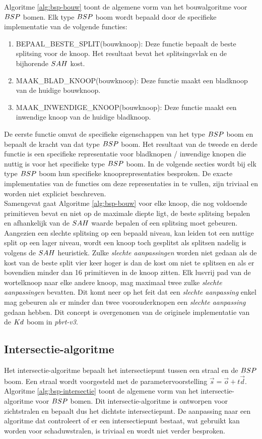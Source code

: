 Algoritme \ref{alg:bsp-bouw} toont de algemene vorm van het bouwalgoritme voor $BSP$ bomen.
Elk type $BSP$ boom wordt bepaald door de specifieke implementatie van de volgende functies:
\begin{enumerate}
    \item BEPAAL\_BESTE\_SPLIT(bouwknoop): Deze functie bepaalt de beste splitsing voor de knoop. Het resultaat bevat het splitsingsvlak en de bijhorende $SAH$ kost.
    \item MAAK\_BLAD\_KNOOP(bouwknoop): Deze functie maakt een bladknoop van de huidige bouwknoop.
    \item MAAK\_INWENDIGE\_KNOOP(bouwknoop): Deze functie maakt een inwendige knoop van de huidige bladknoop.
\end{enumerate}
De eerste functie omvat de specifieke eigenschappen van het type $BSP$ boom en bepaalt de kracht van dat type $BSP$ boom. 
Het resultaat van de tweede en derde functie is een specifieke representatie voor bladknopen / inwendige knopen die nuttig is voor het specifieke type $BSP$ boom.
In de volgende secties wordt bij elk type $BSP$ boom hun specifieke knooprepresentaties besproken.
De exacte implementaties van de functies om deze representaties in te vullen, zijn triviaal en worden niet expliciet beschreven.\\


Samengevat gaat Algoritme \ref{alg:bsp-bouw} voor elke knoop, die nog voldoende primitieven bevat en niet op de maximale diepte ligt, de beste splitsing bepalen en afhankelijk van de $SAH$ waarde bepalen of een splitsing moet gebeuren. 
Aangezien een slechte splitsing op een bepaald niveau, kan leiden tot een nuttige split op een lager niveau, wordt een knoop toch gesplitst als splitsen nadelig is volgens de $SAH$ heuristiek.
Zulke \textit{slechte aanpassingen} worden niet gedaan als de kost van de beste split vier keer hoger is dan de kost om niet te splitsen en als er bovendien minder dan 16 primitieven in de knoop zitten.
Elk lusvrij pad van de wortelknoop naar elke andere knoop, mag maximaal twee zulke \textit{slechte aanpassingen} bevatten.
Dit komt neer op het feit dat een \textit{slechte aanpassing} enkel mag gebeuren als er minder dan twee voorouderknopen een \textit{slechte aanpassing} gedaan hebben.
Dit concept is overgenomen van de originele implementatie van de $Kd$ boom in \textit{pbrt-v3}.

\subsection{Intersectie-algoritme}
Het intersectie-algoritme bepaalt het intersectiepunt tussen een straal en de $BSP$ boom.
Een straal wordt voorgesteld met de parametervoorstelling $\vec{s} = \vec{o} + t\vec{d}$.
Algoritme \ref{alg:bsp-intersectie} toont de algemene vorm van het intersectie-algoritme voor $BSP$ bomen.
Dit intersectie-algoritme is ontworpen voor zichtstralen en bepaalt dus het dichtste intersectiepunt.
De aanpassing naar een algoritme dat controleert of er een intersectiepunt bestaat, wat gebruikt kan worden voor schaduwstralen, is triviaal en wordt niet verder besproken.\\

